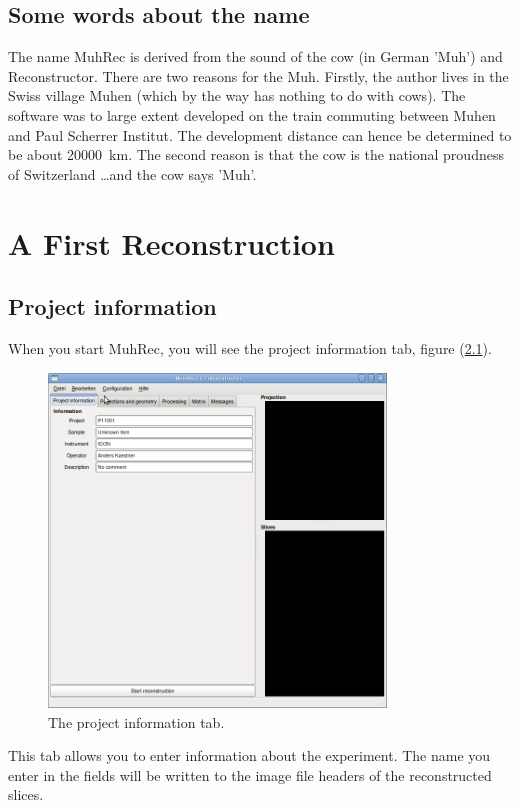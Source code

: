 \documentclass[a4paper]{scrreprt}
\begin{document}
\section{Some words about the name}
The name MuhRec is derived from the sound of the cow (in German 'Muh') and Reconstructor.
There are two reasons for the Muh. Firstly, the author lives in the Swiss village Muhen
(which by the way has nothing to do with cows). The software was to large extent developed
on the train commuting between Muhen and Paul Scherrer Institut. The development distance
can hence be determined to be about 20000~km. The second reason is that the cow is the
national proudness of Switzerland \ldots and the cow says 'Muh'.

\chapter{A First Reconstruction}
\section{Project information}
When you start MuhRec, you will see the project information tab, figure
(\ref{fig_projectinfotab}).
\begin{figure}[ht!]
\centering
 \includegraphics[width=0.8\textwidth]{figures/ProjectInfoTab.png}
\caption{The project information tab.}\label{fig_projectinfotab}
\end{figure}
This tab allows you to enter information about the experiment. The name you
enter in the fields will be written to the image file headers of the
reconstructed slices.
\end{document}
